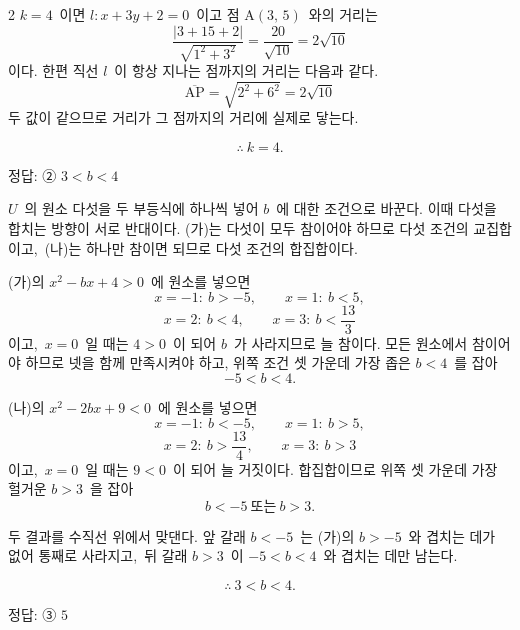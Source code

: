 \documentclass[10pt,fleqn]{article}
\begin{document}
\begin{multicols*}{2}
$k=4$\ 이면 $l:x+3y+2=0$\ 이고 점 $\mathrm{A}(3,\,5)$\ 와의 거리는
$$\dfrac{|3+15+2|}{\sqrt{1^{2}+3^{2}}}=\dfrac{20}{\sqrt{10}}=2\sqrt{10}$$
이다. 한편 직선 $l$\ 이 항상 지나는 점까지의 거리는 다음과 같다.
$$\overline{\mathrm{AP}}=\sqrt{2^{2}+6^{2}}=2\sqrt{10}$$
두 값이 같으므로 거리가 그 점까지의 거리에 실제로 닿는다.

$$\therefore\ k=4.$$


\begin{dmanswerbox}
정답: ② $3<b<4$
\end{dmanswerbox}

$U$\ 의 원소 다섯을 두 부등식에 하나씩 넣어 $b$\ 에 대한 조건으로 바꾼다. 이때 다섯을 합치는 방향이 서로 반대이다. (가)는 다섯이 모두 참이어야 하므로 다섯 조건의 교집합이고,\ (나)는 하나만 참이면 되므로 다섯 조건의 합집합이다.

(가)의 $x^{2}-bx+4>0$\ 에 원소를 넣으면
$$x=-1:\ b>-5,\qquad x=1:\ b<5,$$
$$x=2:\ b<4,\qquad x=3:\ b<\dfrac{13}{3}$$
이고,\ $x=0$\ 일 때는 $4>0$\ 이 되어 $b$\ 가 사라지므로 늘 참이다. 모든 원소에서 참이어야 하므로 넷을 함께 만족시켜야 하고, 위쪽 조건 셋 가운데 가장 좁은 $b<4$\ 를 잡아
$$-5<b<4.$$

(나)의 $x^{2}-2bx+9<0$\ 에 원소를 넣으면
$$x=-1:\ b<-5,\qquad x=1:\ b>5,$$
$$x=2:\ b>\dfrac{13}{4},\qquad x=3:\ b>3$$
이고,\ $x=0$\ 일 때는 $9<0$\ 이 되어 늘 거짓이다. 합집합이므로 위쪽 셋 가운데 가장 헐거운 $b>3$\ 을 잡아
$$b<-5\ \text{또는}\ b>3.$$

두 결과를 수직선 위에서 맞댄다. 앞 갈래 $b<-5$\ 는 (가)의 $b>-5$\ 와 겹치는 데가 없어 통째로 사라지고,\ 뒤 갈래 $b>3$\ 이 $-5<b<4$\ 와 겹치는 데만 남는다.

$$\therefore\ 3<b<4.$$


\begin{dmanswerbox}
정답: ③ $5$
\end{dmanswerbox}


\end{multicols*}
\end{document}
